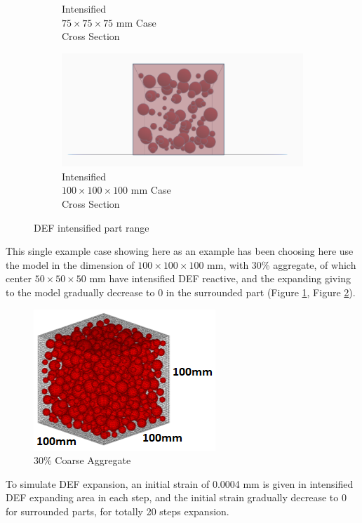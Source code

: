 \begin{figure}[ht]
\begin{subfigure}{.33\textwidth}
      \caption{Intensified \\  $75 \times 75 \times 75$ mm Case \\ Cross Section}
    \end{subfigure}%
    \begin{subfigure}{.33\textwidth}
      \centering
      \includegraphics[width=.9\linewidth]{Files/DEF_X/X-1_3ds.png}
      \caption{Intensified  \\ $100 \times 100 \times 100$ mm Case\\ Cross Section}
    \end{subfigure}
  \caption{DEF intensified part range}
  \label{fig:DEF_sssX}
\end{figure}

This single example case showing here as an example has been choosing here use the model in the dimension of $100 \times 100 \times 100$ mm, with 30\% aggregate, of which center $50 \times 50 \times 50$ mm have intensified DEF reactive, and the expanding giving to the model gradually decrease to 0 in the surrounded part (Figure \ref{fig:DEF_sssX}, Figure \ref{fig:A30_mosssdel}).


  \begin{figure}[ht]
  \centering
  \includegraphics[width=.3\linewidth]{Files/Aggregate/A30.png}
    \caption{30\% Coarse Aggregate}
    \label{fig:A30_mosssdel}
  \end{figure}

To simulate DEF expansion, an initial strain of 0.0004 mm is given in intensified DEF expanding area in each step, and the initial strain gradually decrease to 0 for surrounded parts, for totally 20 steps expansion.

